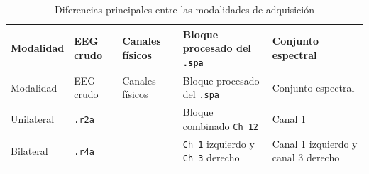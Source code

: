 \documentclass[
  spanish,
  a4paper,
  12pt,
  twoside]{memoir}
\begin{document}
\begin{longtable}[]{@{}
  >{\raggedright\arraybackslash}p{}
  >{\raggedright\arraybackslash}p{}
  >{\raggedleft\arraybackslash}p{}
  >{\raggedright\arraybackslash}p{}
  >{\raggedright\arraybackslash}p{}@{}}
\caption{Diferencias principales entre las modalidades de
adquisición}\label{tbl-modalidades-bis}\tabularnewline
\toprule\noalign{}
\begin{minipage}[b]{\linewidth}\raggedright
Modalidad
\end{minipage} & \begin{minipage}[b]{\linewidth}\raggedright
EEG crudo
\end{minipage} & \begin{minipage}[b]{\linewidth}\raggedleft
Canales físicos
\end{minipage} & \begin{minipage}[b]{\linewidth}\raggedright
Bloque procesado del \texttt{.spa}
\end{minipage} & \begin{minipage}[b]{\linewidth}\raggedright
Conjunto espectral
\end{minipage} \\
\midrule\noalign{}
\endfirsthead
\toprule\noalign{}
\begin{minipage}[b]{\linewidth}\raggedright
Modalidad
\end{minipage} & \begin{minipage}[b]{\linewidth}\raggedright
EEG crudo
\end{minipage} & \begin{minipage}[b]{\linewidth}\raggedleft
Canales físicos
\end{minipage} & \begin{minipage}[b]{\linewidth}\raggedright
Bloque procesado del \texttt{.spa}
\end{minipage} & \begin{minipage}[b]{\linewidth}\raggedright
Conjunto espectral
\end{minipage} \\
\midrule\noalign{}
\endhead
\bottomrule\noalign{}
\endlastfoot
Unilateral & \texttt{.r2a} & 2 & Bloque combinado \texttt{Ch\ 12} &
Canal 1 \\
Bilateral & \texttt{.r4a} & 4 & \texttt{Ch\ 1} izquierdo y
\texttt{Ch\ 3} derecho & Canal 1 izquierdo y canal 3 derecho \\
\end{longtable}
\end{document}
